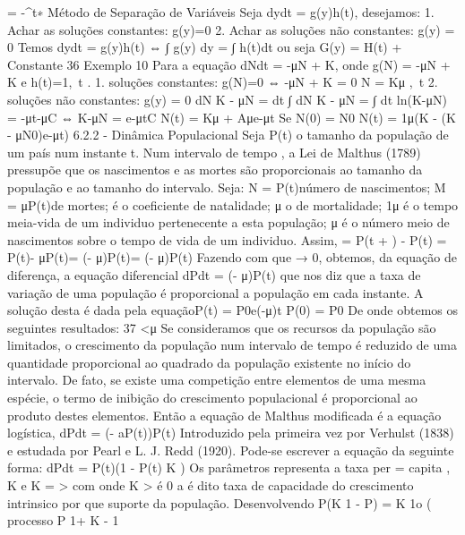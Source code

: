 {{{{{{{{{{{{{= -\lambda^{t}∗ 
Método de Separação de Variáveis Seja dydt = g(y)h(t), desejamos: 1. Achar as soluções constantes: g(y)=0 
2. Achar as soluções não constantes: g(y) = 0 Temos dydt = g(y)h(t) ⇔ ∫ g(y) dy 
= ∫ h(t)dt 
ou seja \Rightarrow  G(y) = H(t) + Constante 
36 
Exemplo 10 Para a equação dNdt = -μN + K, onde g(N) = -μN + K e h(t)=1,\forall\ t . 
1. soluções constantes: g(N)=0 ⇔ -μN + K = 0 \Rightarrow  N = Kμ ,\forall\ t  
2. soluções não constantes: g(y) = 0 
dN K - μN = dt \Rightarrow  ∫ dN 
K - μN = ∫ dt \Rightarrow  ln(K-μN) = -μt-μC ⇔ K-μN = e-μtC \Rightarrow  \Rightarrow  N(t) = Kμ + Aμe-μt Se N(0) = N0 \Rightarrow  N(t) = 1μ(K - (K - μN0)e-μt) 
6.2.2 - Dinâmica Populacional 
Seja P(t) o tamanho da população de um país num instante t. Num intervalo de tempo \Deltat, a Lei de Malthus (1789) pressupõe que os nascimentos e as mortes são proporcionais ao tamanho da população e ao tamanho do intervalo. 
Seja: N = \gamma P(t)\Deltat número de nascimentos; M = μP(t) de mortes; 
\gamma  é o coeficiente de natalidade; μ o de mortalidade; 1μ é o tempo meia-vida de um individuo pertenecente a esta população; \gamma μ é o número meio de nascimentos sobre o tempo de vida de um individuo. Assim, \DeltaP = P(t + \Deltat) - P(t) 
\DeltaP = \gamma P(t)\Deltat - μP(t)\Deltat \DeltaP = (\gamma  - μ)P(t)\Deltat \DeltaP\Deltat = (\gamma  - μ)P(t) Fazendo com que \Deltat → 0, obtemos, da equação de diferença, a equação diferencial dPdt = (\gamma  - μ)P(t) que nos diz que a taxa de variação de uma população é proporcional a população em cada instante. 
A solução desta é dada pela equaçãoP(t) = P0e(\gamma -μ)t 
P(0) = P0 De onde obtemos os seguintes resultados: 
37 
\gamma <μ 
Se consideramos que os recursos da população são limitados, o crescimento da população num intervalo de tempo é reduzido de uma quantidade proporcional ao quadrado da população existente no início do intervalo. De fato, se existe uma competição entre elementos de uma mesma espécie, o termo de inibição do crescimento populacional é proporcional ao produto destes elementos. Então a equação de Malthus modificada é a equação logística, 
dPdt = (\lambda - aP(t))P(t) Introduzido pela primeira vez por Verhulst (1838) e estudada por Pearl e L. J. Redd (1920). Pode-se escrever a equação da seguinte forma: 
dPdt = \gamma P(t)(1 - P(t) 
K 
) 
Os parâmetros \gamma  representa a taxa per = capita \lambda, K e K = >  com onde \gamma  K > é 0 a é dito taxa de capacidade do crescimento intrinsico por que 
suporte da população. Desenvolvendo P(K 1 - P) = K 
1o ( processo P 1+ K - 1 
}}}}}}}}}}}}}
